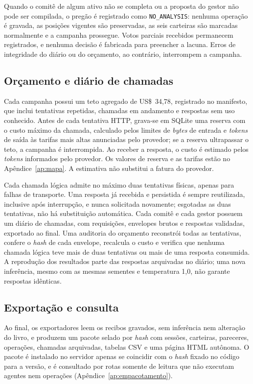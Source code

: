Quando o comitê de algum ativo não se completa ou a proposta do gestor não pode ser compilada, o pregão é registrado como \texttt{NO\_ANALYSIS}: nenhuma operação é gravada, as posições vigentes são preservadas, as seis carteiras são marcadas normalmente e a campanha prossegue. Votos parciais recebidos permanecem registrados, e nenhuma decisão é fabricada para preencher a lacuna. Erros de integridade do diário ou do orçamento, ao contrário, interrompem a campanha.

\subsection{Orçamento e diário de chamadas}

Cada campanha possui um teto agregado de US\$~34,78, registrado no manifesto, que inclui tentativas repetidas, chamadas em andamento e respostas sem uso conhecido. Antes de cada tentativa HTTP, grava-se em SQLite uma reserva com o custo máximo da chamada, calculado pelos limites de \textit{bytes} de entrada e \textit{tokens} de saída às tarifas mais altas anunciadas pelo provedor; se a reserva ultrapassar o teto, a campanha é interrompida. Ao receber a resposta, o custo é estimado pelos \textit{tokens} informados pelo provedor. Os valores de reserva e as tarifas estão no Apêndice~\ref{ap:mapa}. A estimativa não substitui a fatura do provedor.

Cada chamada lógica admite no máximo duas tentativas físicas, apenas para falhas de transporte. Uma resposta já recebida e persistida é sempre reutilizada, inclusive após interrupção, e nunca solicitada novamente; esgotadas as duas tentativas, não há substituição automática. Cada comitê e cada gestor possuem um diário de chamadas, com requisições, envelopes brutos e respostas validadas, exportado ao final. Uma auditoria do orçamento reconstrói todas as tentativas, confere o \textit{hash} de cada envelope, recalcula o custo e verifica que nenhuma chamada lógica teve mais de duas tentativas ou mais de uma resposta consumida. A reprodução dos resultados parte das respostas arquivadas no diário; uma nova inferência, mesmo com as mesmas sementes e temperatura 1,0, não garante respostas idênticas.

\subsection{Exportação e consulta}

Ao final, os exportadores leem os recibos gravados, sem inferência nem alteração do livro, e produzem um pacote selado por \textit{hash} com sessões, carteiras, pareceres, operações, chamadas arquivadas, tabelas CSV e uma página HTML autônoma. O pacote é instalado no servidor apenas se coincidir com o \textit{hash} fixado no código para a versão, e é consultado por rotas somente de leitura que não executam agentes nem operações (Apêndice~\ref{ap:empacotamento}).
